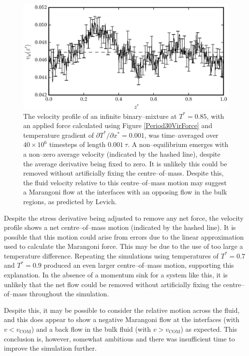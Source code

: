 \FloatBarrier
\begin{figure}[h!]
\centering
\includegraphics[scale=1.0]{Period30VirFlow}
\caption{The velocity profile of an infinite binary--mixture at $T^{*}=0.85$, with an applied force calculated using Figure \ref{Period30VirForce} and temperature gradient of $\partial T^{*} / \partial x^{*} = 0.001$, was time--averaged over $40 \times 10^{6}$ timesteps of length $0.001\ \tau$.
A non--equilibrium emerges with a non--zero average velocity (indicated by the hashed line), despite the average derivative being fixed to zero.
It is unlikely this could be removed without artificially fixing the centre--of--mass.
Despite this, the fluid velocity relative to this centre--of--mass motion may suggest a Marangoni flow at the interfaces with an opposing flow in the bulk regions, as predicted by Levich.\cite{Levich}
}
\label{Period30VirFlow}
\end{figure}

Despite the stress derivative being adjusted to remove any net force, the velocity profile shows a net centre--of--mass motion (indicated by the hashed line).
It is possible that this motion could arise from errors due to the linear approximation used to calculate the Marangoni force.
This may be due to the use of too large a temperature difference.
Repeating the simulations using temperatures of $T^{*}=0.7$ and $T^{*}=0.9$ produced an even larger centre--of--mass motion, supporting this explanation.
In the absence of a momentum sink for a system like this, it is unlikely that the net flow could be removed without artificially fixing the centre--of--mass throughout the simulation.

Despite this, it may be possible to consider the relative motion across the fluid, and this does appear to show a negative Marangoni flow at the interfaces (with $v < v_{\mathrm{COM}}$) and a back flow in the bulk fluid (with $v > v_{\mathrm{COM}}$) as expected. 
This conclusion is, however, somewhat ambitious and there was insufficient time to improve the simulation further.

